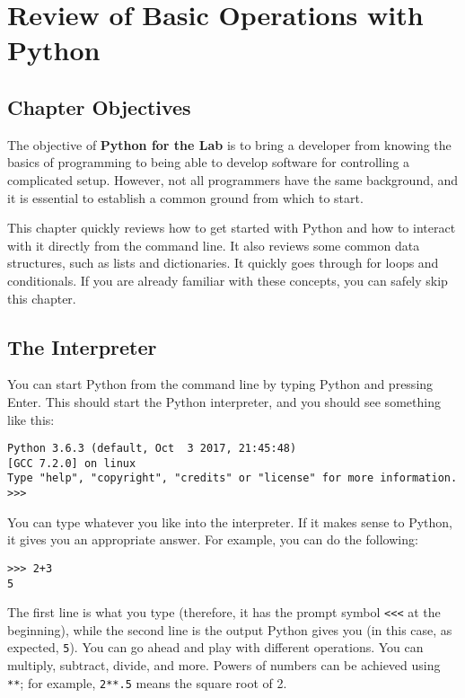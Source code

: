 \chapter[Python Quick Overview]{Review of Basic Operations with Python}\label{ch:review-of-basic-operations-withpython}

\section{Chapter Objectives}\label{sec:chapterobjectives}

The objective of \textbf{Python for the Lab} is to bring a developer from knowing the basics of programming to being able to develop software for controlling a complicated setup. However, not all programmers have the same background, and it is essential to establish a common ground from which to start.

This chapter quickly reviews how to get started with Python and how to interact with it directly from the command line. It also reviews some common data structures, such as lists and dictionaries. It quickly goes through for loops and conditionals. If you are already familiar with these concepts, you can safely skip this chapter.

\section{The Interpreter}\label{sec:theinterpreter}
You can start Python from the command line by typing Python and pressing Enter. This should start the Python interpreter, and you should see something like this:

\begin{verbatim}
Python 3.6.3 (default, Oct  3 2017, 21:45:48)
[GCC 7.2.0] on linux
Type "help", "copyright", "credits" or "license" for more information.
>>>
\end{verbatim}

You can type whatever you like into the interpreter. If it makes sense to Python, it gives you an appropriate answer. For example, you can do the following:

\begin{verbatim}
>>> 2+3
5
\end{verbatim}

The first line is what you type (therefore, it has the prompt symbol \texttt{<<<} at the beginning), while the second line is the output Python gives you (in this case, as expected, \texttt{5}). You can go ahead and play with different operations. You can multiply, subtract, divide, and more. Powers of numbers can be achieved using \texttt{**}; for example, \texttt{2**.5} means the square root of 2.

